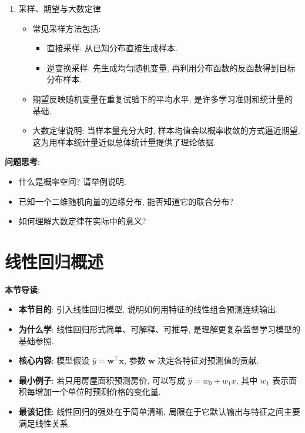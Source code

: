 \documentclass{../nndlcourse}
\begin{document}
\begin{enumerate}
\begin{itemize}
      \item 若 $X$ 与 $Y$ 的联合分布等于各自边际分布的乘积, 则称它们相互独立.
    \end{itemize}
  \item 采样、期望与大数定律
    \begin{itemize}
      \item 常见采样方法包括:
        \begin{itemize}
          \item 直接采样: 从已知分布直接生成样本.
          \item 逆变换采样: 先生成均匀随机变量, 再利用分布函数的反函数得到目标分布样本.
        \end{itemize}
      \item 期望反映随机变量在重复试验下的平均水平, 是许多学习准则和统计量的基础.
      \item 大数定律说明: 当样本量充分大时, 样本均值会以概率收敛的方式逼近期望, 这为用样本统计量近似总体统计量提供了理论依据.
    \end{itemize}
\end{enumerate}

\textbf{问题思考}:

\begin{itemize}
  \item 什么是概率空间? 请举例说明. 
  \item 已知一个二维随机向量的边缘分布, 能否知道它的联合分布? 
  \item 如何理解大数定律在实际中的意义? 
\end{itemize}


\section{线性回归概述}
\textbf{本节导读}:
\begin{itemize}
  \item \textbf{本节目的}: 引入线性回归模型, 说明如何用特征的线性组合预测连续输出.
  \item \textbf{为什么学}: 线性回归形式简单、可解释、可推导, 是理解更复杂监督学习模型的基础参照.
  \item \textbf{核心内容}: 模型假设 $\hat{y}=\boldsymbol{w}^{\top}\boldsymbol{x}$, 参数 $\boldsymbol{w}$ 决定各特征对预测值的贡献.
  \item \textbf{最小例子}: 若只用房屋面积预测房价, 可以写成 $\hat{y}=w_0+w_1x$, 其中 $w_1$ 表示面积每增加一个单位时预测价格的变化量.
  \item \textbf{最该记住}: 线性回归的强处在于简单清晰, 局限在于它默认输出与特征之间主要满足线性关系.
\end{itemize}
\end{document}
